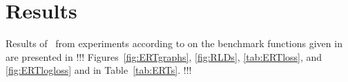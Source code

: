 \documentclass{sig-alternate}
\newcommand{\TODO}[1]{{\color{orange} !!! #1 !!!}}
\begin{document}
\section{Results}

Results of \algname\ from experiments according to \cite{biobj2016exp} on the benchmark
functions given in \cite{biobj2016func} are presented in
\TODO{Figures~\ref{fig:ERTgraphs}, \ref{fig:RLDs}, \ref{tab:ERTloss}, and \ref{fig:ERTlogloss} and in
Table~\ref{tab:ERTs}.}



\end{document}
